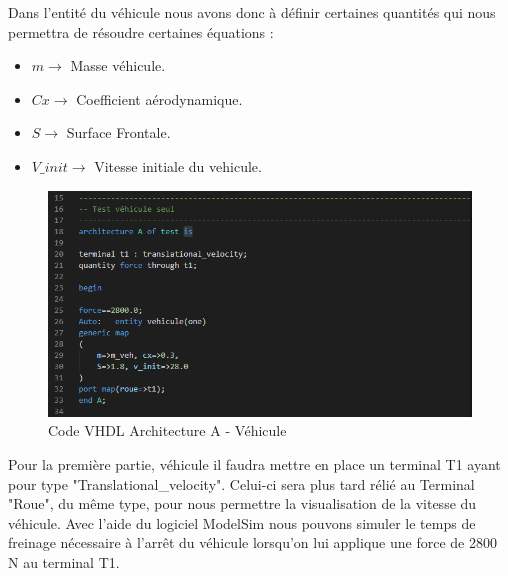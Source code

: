 Dans l'entité du véhicule nous avons donc à définir certaines quantités qui nous permettra de résoudre certaines équations :\\

\begin{itemize}
        \item $m        \rightarrow$ Masse véhicule.
        \item $Cx       \rightarrow$ Coefficient aérodynamique.
        \item $S        \rightarrow$ Surface Frontale.
        \item $V\_init  \rightarrow$ Vitesse initiale du vehicule.
\end{itemize}

\begin{figure}[h]
    \centering
    \includegraphics[width=\textwidth]{images/vehicule.png}
    \caption{Code VHDL Architecture A - Véhicule}
\end{figure}

Pour la première partie, véhicule il faudra mettre en place un terminal T1 ayant pour type "Translational\_velocity". Celui-ci sera plus tard rélié au Terminal "Roue", du même type, pour nous permettre la visualisation de la vitesse du véhicule.
\newpage
Avec l'aide du logiciel ModelSim nous pouvons simuler le temps de freinage nécessaire à l'arrêt du véhicule lorsqu'on lui applique une force de 2800 N au terminal T1.

